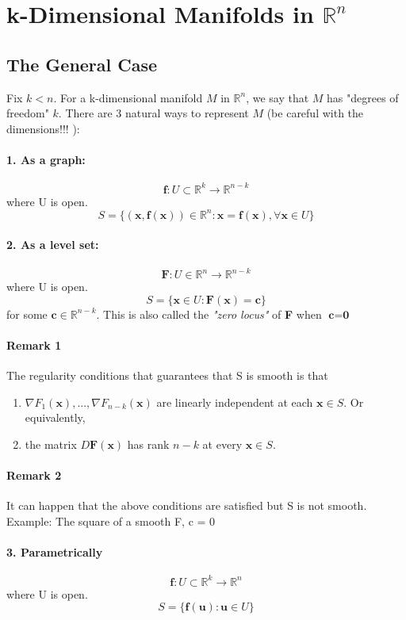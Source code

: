\documentclass[11pt]{article}
\newcommand{\ti}[1]{\textit{#1}}
\newcommand{\tb}[1]{\textbf{#1}}
\newcommand{\real}[0]{\mathbb{R}}
\newcommand{\func}[3]{\tb{#1}: {#2} \rightarrow {#3} }
\begin{document}
\section{k-Dimensional Manifolds in $\real^n$}
\subsection{The General Case}
Fix $k < n$. For a k-dimensional manifold $M$ in $\real^n$, we say that $M$ has "degrees of freedom" $k$. There are 3 natural ways to represent $M$ (be careful with the dimensions!!! ):
\paragraph{1. As a \tb{graph}:}
        $$\func{f}{U \subset \real^k}{\real^{n-k}}$$ where U is open.
        $$ S = \{(\tb{x}, \tb{f}(\tb{x})) \in \real^n: \tb{x} = \tb{f}(\tb{x}), \forall \tb{x} \in U \}$$
\paragraph{2. As a \tb{level set}:}
    $$ \func{F}{U\in \real^n}{\real^{n-k}}$$ where U is open.
    $$ S = \{\tb{x} \in U: \tb{F}(\tb{x}) = \tb{c}\}$$ for some $\tb{c} \in \real^{n-k}$.\newline
    This is also called the \ti{"zero locus"} of \tb{F} when $\tb{c} = \tb{0}$
\paragraph{Remark 1} The regularity conditions that guarantees that S is smooth is that
\begin{enumerate}
    \item $\nabla F_1(\tb{x}), ..., \nabla F_{n-k}(\tb{x})$ are linearly independent at each $\tb{x} \in S$. Or equivalently,
    \item the matrix $D\tb{F}(\tb{x})$ has rank $n-k$ at every $\tb{x} \in S$.
\end{enumerate}
\paragraph{Remark 2} It can happen that the above conditions are satisfied but S is not smooth. Example: The square of a smooth F, c = 0
\paragraph{3. Parametrically}
$$\func{f}{U \subset \real^k}{\real^{n}}$$ where U is open.
$$ S = \{\tb{f}(\tb{u}): \tb{u} \in U\}$$
\end{document}
